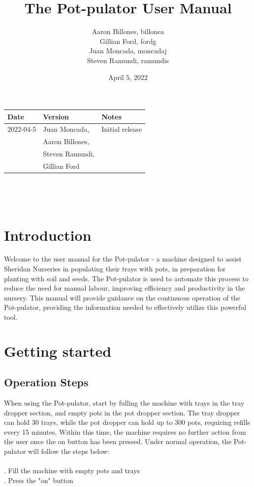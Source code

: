 \documentclass{article}
\title{The Pot-pulator User Manual}
\author{Aaron Billones, billonea\\Gillian Ford, fordg\\Juan Moncada, moncadaj\\Steven Ramundi, ramundis}
\date{April 5, 2022}
\begin{document}
\maketitle
\thispagestyle{empty}


\begin{tabularx}{\textwidth}{p{3cm}p{4cm}X}
    \toprule {\bf Date} & {\bf Version} & {\bf Notes}\\
    \midrule
    2022-04-5 & Juan Moncada,& Initial release\\&Aaron Billones,\\&Steven Ramundi,\\&Gillian Ford \\
    
    \bottomrule
\end{tabularx}

~\newpage

\tableofcontents

~\newpage


\section{Introduction}

Welcome to the user manual for the Pot-pulator - a machine designed to assist Sheridan Nurseries in populating their trays with pots, in preparation for planting with soil and seeds. The Pot-pulator is used to automate this process to reduce the need for manual labour, improving efficiency and productivity in the nursery. This manual will provide guidance on the continuous operation of the Pot-pulator, providing the information needed to effectively utilize this powerful tool.

\section{Getting started}

\subsection{Operation Steps}
When using the Pot-pulator, start by fulling the machine with trays in the tray dropper section, and empty pots in the pot dropper section. The tray dropper can hold 30 trays, while the pot dropper can hold up to 300 pots, requiring refills every 15 minutes. Within this time, the machine requires no further action from the user once the on button has been pressed. Under normal operation, the Pot-pulator will follow the steps below:
\\
\\ .	Fill the machine with empty pots and trays\\ 
.	Press the "on" button
\end{document}
